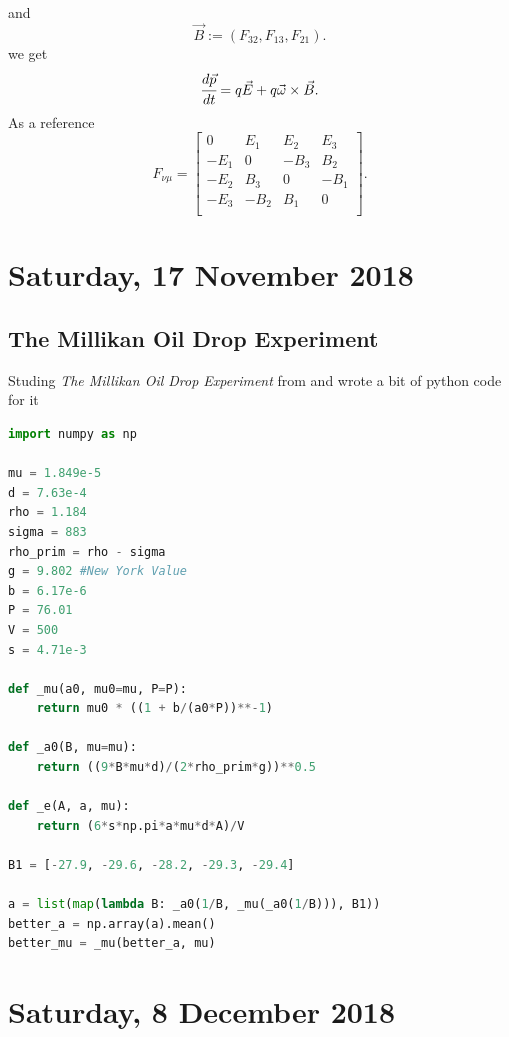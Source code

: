 \documentclass[main.tex]{subfiles}
\begin{document}
and
\begin{equation}
\label{rel_magnetic}
\vec{B} := (F_{32}, F_{13}, F_{21}).
\end{equation}
we get
\begin{equation}
\cfrac{d\vec{p}}{dt} = q\vec{E} + q\vec{\omega}\times \vec{B}.
\end{equation}
As a reference
\begin{equation}
F_{\nu\mu} = 
\begin{bmatrix}
0 & E_1 & E_2 & E_3 \\
-E_1 & 0 & -B_3 & B_2 \\
-E_2 & B_3 & 0 & -B_1 \\
-E_3 & -B_2 & B_1 & 0 \\
\end{bmatrix}.
\end{equation}
\section{Saturday, 17 November 2018}
\subsection{The Millikan Oil Drop Experiment}
Studing \textit{The Millikan Oil Drop Experiment} from \cite{melissinos-napolitano2003} and wrote a bit of python code for it
\begin{lstlisting}[language=Python, caption=How to calculate elementary charge from experiment data]
import numpy as np

mu = 1.849e-5
d = 7.63e-4
rho = 1.184 
sigma = 883
rho_prim = rho - sigma
g = 9.802 #New York Value
b = 6.17e-6
P = 76.01
V = 500
s = 4.71e-3

def _mu(a0, mu0=mu, P=P):
    return mu0 * ((1 + b/(a0*P))**-1)

def _a0(B, mu=mu):
    return ((9*B*mu*d)/(2*rho_prim*g))**0.5

def _e(A, a, mu):
    return (6*s*np.pi*a*mu*d*A)/V

B1 = [-27.9, -29.6, -28.2, -29.3, -29.4]

a = list(map(lambda B: _a0(1/B, _mu(_a0(1/B))), B1))
better_a = np.array(a).mean()
better_mu = _mu(better_a, mu)
\end{lstlisting}
\section{Saturday, 8 December 2018}
\end{document}
